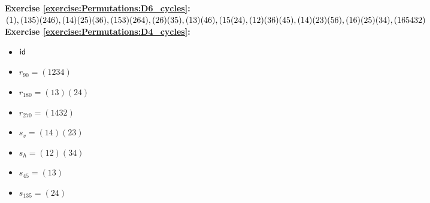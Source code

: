 \noindent\textbf{Exercise \ref{exercise:Permutations:D6_cycles}:}\\ %
$(1), (135)(246), (14)(25)(36), (153)(264), (26)(35), (13)(46), \\(15(24), (12)(36)(45), (14)(23)(56), (16)(25)(34), (165432)$\\

\noindent\textbf{Exercise \ref{exercise:Permutations:D4_cycles}:}
\begin{multicols}{3}
\begin{itemize}
\item
$\sf{id}$

\item
$r_{90} = (1234)$

\item
$r_{180} = (13)(24)$

\item
$r_{270} = (1432)$

\item
$s_v = (14)(23)$

\item
$s_h = (12)(34)$

\item
$s_{45} = (13)$

\item
$s_{135} = (24)$
\end{itemize}
\end{multicols}

